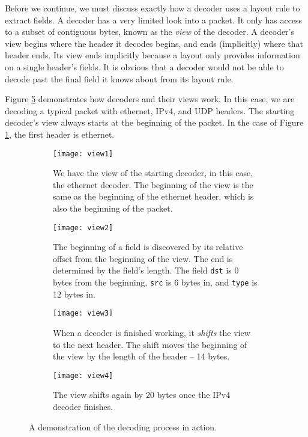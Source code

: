 Before we continue, we must discuss exactly how a decoder uses a layout rule to
extract fields. A decoder has a very limited look into a packet. It only has
access to a subset of contiguous bytes, known as the \textit{view} of the
decoder. A decoder's view begins where the header it decodes begins, and ends
(implicitly) where that header ends. Its view ends implicitly because a layout
only provides information on a single header's fields. It is obvious that a
decoder would not be able to decode past the final field it knows about from its
layout rule.

Figure \ref{fg:decoding} demonstrates how decoders and their views work. In this
case, we are decoding a typical packet with ethernet, IPv4, and UDP headers. The
starting decoder's view always starts at the beginning of the packet. In the
case of Figure \ref{fg:view1}, the first header is ethernet.

\begin{figure}[ht]
\begin{subfigure}[t]{.45\textwidth}
  \centering
  \texttt{[image: view1]}
  \caption{We have the view of the starting decoder, in this case, the ethernet
decoder. The beginning of the view is the same as the beginning of the ethernet
header, which is also the beginning of the packet.}
  \label{fg:view1}
\end{subfigure}%
\hfill
\begin{subfigure}[t]{.45\textwidth}
  \centering
  \texttt{[image: view2]}
  \caption{The beginning of a field is discovered by its relative offset from
the beginning of the view. The end is determined by the field's length. The
field \texttt{dst} is 0 bytes from the beginning, \texttt{src} is 6 bytes in,
and \texttt{type} is 12 bytes in.}
  \label{fg:view2}
\end{subfigure}

\begin{subfigure}[t]{.45\textwidth}
  \centering
  \texttt{[image: view3]}
  \caption{When a decoder is finished working, it \textit{shifts} the view to
the next header. The shift moves the beginning of the view by the length of the
header -- 14 bytes.}
  \label{fg:view3}
\end{subfigure}%
\hfill
\begin{subfigure}[t]{.45\textwidth}
  \centering
  \texttt{[image: view4]}
  \caption{The view shifts again by 20 bytes once the IPv4 decoder finishes.}
  \label{fg:view4}
\end{subfigure}
\caption{A demonstration of the decoding process in action.}
\label{fg:decoding}
\end{figure}

